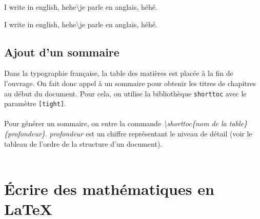 \documentclass[a4paper, 10pt]{book}
\begin{document}
I write in english, hehe\textbackslash je parle en anglais, héhé.

I write in english, hehe\textbackslash je parle en anglais, héhé. \\ 
\section{Ajout d'un sommaire\\}	
Dans la typographie française, la table des matières est placée à la fin de l'ouvrage. On fait donc appel à un sommaire pour obtenir les titres de chapitres au début du document. Pour cela, on utilise la bibliothèque \texttt{shorttoc} avec le paramètre \texttt{[tight]}. \\\\
Pour générer un sommaire, on entre la commande \textit{\textbackslash shorttoc\{nom de la table\}\{profondeur\}}. \textit{profondeur} est un chiffre représentant le niveau de détail (voir le tableau de l'ordre de la structure d'un document).\\ \\

\chapter{\'Ecrire des mathématiques en LaTeX}



\backmatter




\tableofcontents
\end{document}
